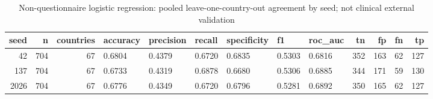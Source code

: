 \begin{table}
\caption{Non-questionnaire logistic regression: pooled leave-one-country-out agreement by seed; not clinical external validation}
\label{tab:table8_country_held_out}
\begin{tabular}{rrrllllllrrrr}
\toprule
seed & n & countries & accuracy & precision & recall & specificity & f1 & roc\_auc & tn & fp & fn & tp \\
\midrule
42 & 704 & 67 & 0.6804 & 0.4379 & 0.6720 & 0.6835 & 0.5303 & 0.6816 & 352 & 163 & 62 & 127 \\
137 & 704 & 67 & 0.6733 & 0.4319 & 0.6878 & 0.6680 & 0.5306 & 0.6885 & 344 & 171 & 59 & 130 \\
2026 & 704 & 67 & 0.6776 & 0.4349 & 0.6720 & 0.6796 & 0.5281 & 0.6892 & 350 & 165 & 62 & 127 \\
\bottomrule
\end{tabular}
\end{table}
